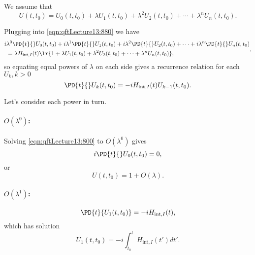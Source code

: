 We assume that
\begin{dmath}\label{eqn:qftLecture13:900}
U(t, t_0)
=
U_0(t, t_0)
+ \lambda U_1(t, t_0)
+ \lambda^2 U_2(t, t_0)
+ \cdots
+ \lambda^n U_n(t, t_0).
\end{dmath}

Plugging into \cref{eqn:qftLecture13:880} we have
\begin{dmath}\label{eqn:qftLecture13:1160}
\begin{aligned}
  i &\lambda^0 \PD{t}{}U_0(t, t_0)
+ i \lambda^1 \PD{t}{}U_1(t, t_0)
+ i \lambda^2 \PD{t}{}U_2(t, t_0)
+ \cdots
+ i \lambda^n \PD{t}{}U_n(t, t_0) \\
&=
\lambda H_{\text{int}, I}(t)
\lr{
1
+ \lambda U_1(t, t_0)
+ \lambda^2 U_2(t, t_0)
+ \cdots
+ \lambda^n U_n(t, t_0)
},
\end{aligned},
\end{dmath}
so
equating equal powers of \( \lambda \) on each side gives a recurrence relation for each \( U_k, k > 0 \)
\begin{dmath}\label{eqn:qftLecture13:1180}
\PD{t}{}U_k(t, t_0) = -i H_{\text{int}, I}(t) U_{k-1}(t, t_0).
\end{dmath}

Let's consider each power in turn.
\paragraph{\(O(\lambda^0)\):}

Solving \cref{eqn:qftLecture13:800} to \( O(\lambda^0) \) gives
\begin{dmath}\label{eqn:qftLecture13:840}
i \PD{t}{} U_0(t, t_0) = 0,
\end{dmath}
or
\begin{dmath}\label{eqn:qftLecture13:860}
U(t, t_0) = 1 + O(\lambda).
\end{dmath}

\paragraph{\(O(\lambda^1)\):}
\begin{dmath}\label{eqn:qftLecture13:940}
\PD{t}{U_1(t, t_0)} = -i H_{\text{int}, I}(t),
\end{dmath}
which has solution
\begin{dmath}\label{eqn:qftLecture13:960}
U_1(t, t_0) = -i \int_{t_0}^t H_{\text{int}, I}(t') dt'.
\end{dmath}

